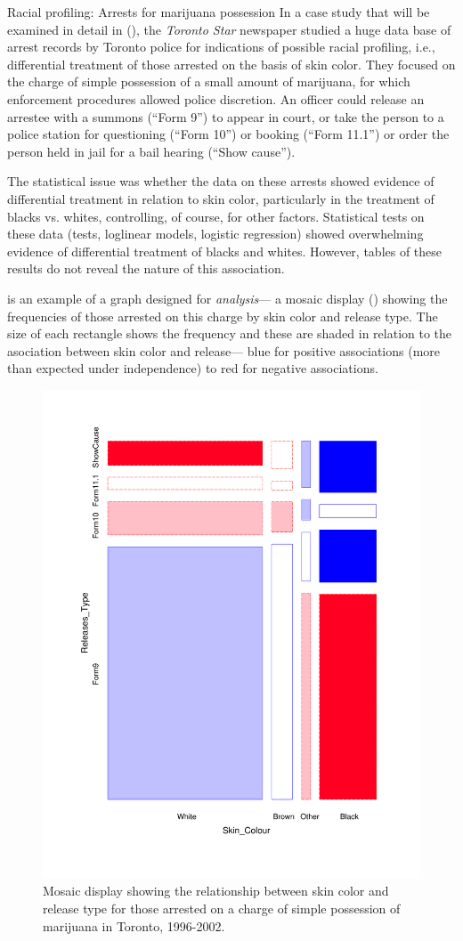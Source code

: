 \documentclass[10pt,krantz2]{krantz}\usepackage[]{graphicx}\usepackage[]{color}
\begin{document}
\begin{Example}[arrests0]{Racial profiling: Arrests for marijuana possession}
In a case study that will be examined in detail in  (),
the \emph{Toronto Star} newspaper studied a huge data base of arrest records by
Toronto police for indications of possible racial profiling, i.e., differential
treatment of those arrested on the basis of skin color.
They focused on the charge of simple possession of a small amount of marijuana,
for which enforcement procedures allowed police discretion.  An officer could
release an arrestee with a summons (``Form 9'') to appear in court,
or take the person to a police station for questioning (``Form 10'') or
booking (``Form 11.1'') or order the person held in jail for a bail hearing (``Show cause'').


The statistical issue was whether the data on these arrests showed evidence of differential
treatment in relation to skin color, particularly in the treatment of blacks vs. whites,
controlling, of course, for other factors. Statistical tests on these data
(\chisq tests, loglinear models, logistic regression) showed overwhelming evidence of
differential treatment of blacks and whites. However, tables of these results do not
reveal the nature of this association.

 is an example of
a graph designed for \emph{analysis}--- a mosaic display ()
showing the frequencies of those arrested
on this charge by skin color and release type.  The size of each rectangle shows the
frequency and these are shaded in relation to the asociation between skin color and
release--- blue for positive associations (more than expected under independence) to
red for negative associations.
\begin{figure}[htb]
\centering
\includegraphics[width=.5\textwidth]{ch01/fig/arrests-skin-color}
\caption{Mosaic display showing the relationship between skin color and release type for those arrested on a charge of simple possession of marijuana in Toronto, 1996-2002.}\label{fig:arrests0-mosaic}
\end{figure}


\end{Example}
\end{document}
